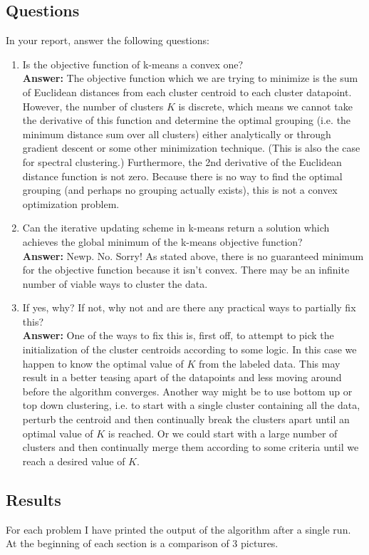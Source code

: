 \documentclass[11pt]{article}
\begin{document}
\subsection*{Questions}
In your report, answer the following questions: 
\begin{enumerate}
\item Is the objective function of k-means a convex one?
\\[5pt] {\bf Answer:} The objective function which we are trying to minimize is the sum of Euclidean distances from each cluster centroid to each cluster datapoint. However, the number of clusters $K$ is discrete, which means we cannot take the derivative of this function and determine the optimal grouping (i.e. the minimum distance sum over all clusters) either analytically or through gradient descent or some other minimization technique. (This is also the case for spectral clustering.) Furthermore, the 2nd derivative of the Euclidean distance function is not zero. Because there is no way to find the optimal grouping (and perhaps no grouping actually exists), this is not a convex optimization problem. 

\item Can the iterative updating scheme in k-means return a solution which achieves the global minimum of the k-means objective function?
\\[5pt] {\bf Answer:} Newp. No. Sorry! As stated above, there is no guaranteed minimum for the objective function because it isn't convex. There may be an infinite number of viable ways to cluster the data. 
\item If yes, why? If not, why not and are there any practical ways to partially fix this?
\\[5pt] {\bf Answer:} One of the ways to fix this is, first off, to attempt to pick the initialization of the cluster centroids according to some logic. In this case we happen to know the optimal value of $K$ from the labeled data. This may result in a better teasing apart of the datapoints and less moving around before the algorithm converges. Another way might be to use bottom up or top down clustering, i.e. to start with a single cluster containing all the data, perturb the centroid and then continually break the clusters apart until an optimal value of $K$ is reached. Or we could start with a large number of clusters and then continually merge them according to some criteria until we reach a desired value of $K$. 
\end{enumerate}
\subsection*{Results}
For each problem I have printed the output of the algorithm after a single run. At the beginning of each section is a comparison of 3 pictures. 
\end{document}
